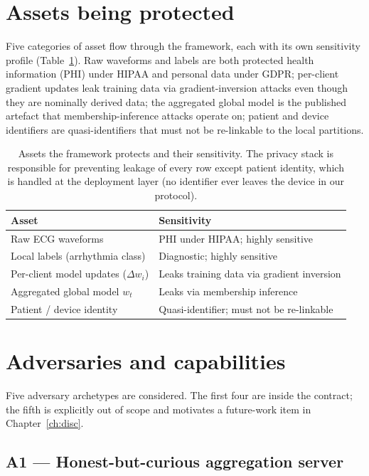 \documentclass[11pt,a4paper]{report}
\begin{document}
\section{Assets being protected}

Five categories of asset flow through the framework, each with its own
sensitivity profile (Table~\ref{tab:assets}). Raw waveforms and labels are
both protected health information (PHI) under HIPAA and personal data under
GDPR; per-client gradient updates leak training data via gradient-inversion
attacks even though they are nominally derived data; the aggregated global
model is the published artefact that membership-inference attacks operate on;
patient and device identifiers are quasi-identifiers that must not be
re-linkable to the local partitions.

\begin{table}[h]
  \centering
  \caption{Assets the framework protects and their sensitivity. The privacy
  stack is responsible for preventing leakage of every row except patient
  identity, which is handled at the deployment layer (no identifier ever
  leaves the device in our protocol).}
  \label{tab:assets}
  \begin{tabular}{ll}
    \toprule
    Asset & Sensitivity \\
    \midrule
    Raw ECG waveforms                       & PHI under HIPAA; highly sensitive \\
    Local labels (arrhythmia class)         & Diagnostic; highly sensitive \\
    Per-client model updates ($\Delta w_i$) & Leaks training data via gradient inversion \\
    Aggregated global model $w_t$           & Leaks via membership inference \\
    Patient / device identity               & Quasi-identifier; must not be re-linkable \\
    \bottomrule
  \end{tabular}
\end{table}

\section{Adversaries and capabilities}

Five adversary archetypes are considered. The first four are inside the
contract; the fifth is explicitly out of scope and motivates a future-work
item in Chapter~\ref{ch:disc}.

\subsection{A1 --- Honest-but-curious aggregation server}
\end{document}
